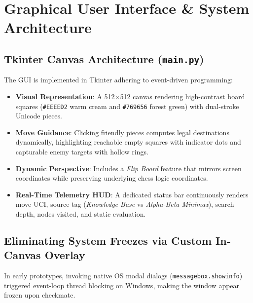 \documentclass[11pt,a4paper]{article}
\begin{document}
\section{Graphical User Interface \& System Architecture}

\subsection{Tkinter Canvas Architecture (\texttt{main.py})}
The GUI is implemented in Tkinter adhering to event-driven programming:
\begin{itemize}[leftmargin=*]
    \item \textbf{Visual Representation}: A 512$\times$512 canvas rendering high-contrast board squares (\texttt{\#EEEED2} warm cream and \texttt{\#769656} forest green) with dual-stroke Unicode pieces.
    \item \textbf{Move Guidance}: Clicking friendly pieces computes legal destinations dynamically, highlighting reachable empty squares with indicator dots and capturable enemy targets with hollow rings.
    \item \textbf{Dynamic Perspective}: Includes a \textit{Flip Board} feature that mirrors screen coordinates while preserving underlying chess logic coordinates.
    \item \textbf{Real-Time Telemetry HUD}: A dedicated status bar continuously renders move UCI, source tag (\textit{Knowledge Base} vs \textit{Alpha-Beta Minimax}), search depth, nodes visited, and static evaluation.
\end{itemize}

\subsection{Eliminating System Freezes via Custom In-Canvas Overlay}
In early prototypes, invoking native OS modal dialogs (\texttt{messagebox.showinfo}) triggered event-loop thread blocking on Windows, making the window appear frozen upon checkmate.
\end{document}
